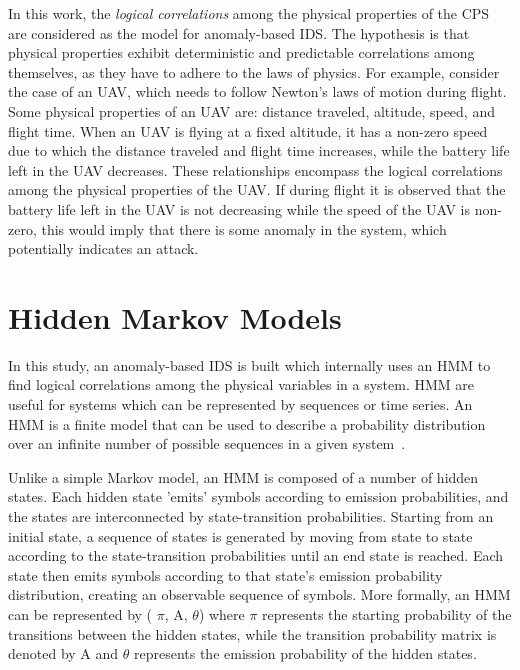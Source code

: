 In this work, the {\em logical correlations} among the physical properties of the \ac{CPS} are considered as the model for anomaly-based \ac{IDS}. The hypothesis is that physical properties exhibit deterministic and predictable correlations among themselves, as they have to adhere to the laws of physics. For example, consider the case of an \ac{UAV}, which needs to follow Newton's laws of motion during flight. Some physical properties of an \ac{UAV} are: distance traveled, altitude, speed, and flight time. When an \ac{UAV} is flying at a fixed altitude, it has a non-zero speed due to which the distance traveled and flight time increases, while the battery life left in the \ac{UAV} decreases. These relationships encompass the logical correlations among the physical properties of the \ac{UAV}. If during flight it is observed that the battery life left in the \ac{UAV} is not decreasing while the speed of the \ac{UAV} is non-zero, this would imply that there is some anomaly in the system, which potentially indicates an attack.

\section{Hidden Markov Models}
\label{sec:HMM_explain}

In this study, an anomaly-based \ac{IDS} is built which internally uses an \ac{HMM} to find logical correlations among the physical variables in a system. \ac{HMM} are useful for systems which can be represented by sequences or time series. An \ac{HMM} is a finite model that can be used to describe a probability distribution over an infinite number of possible sequences in a given system~\cite{eddy1996hidden}.

Unlike a simple Markov model, an \ac{HMM} is composed of a number of hidden states. Each hidden state 'emits' symbols according to emission probabilities, and the states are interconnected by state-transition probabilities. Starting from an initial state, a sequence of states is generated by moving from state to state according to the state-transition probabilities until an end state is reached. Each state then emits symbols according to that state's emission probability distribution, creating an observable sequence of symbols.
More formally, an \ac{HMM} can be represented by ( $\pi$, A, $\theta$) where $\pi$ represents the starting probability of the transitions between the hidden states, while the transition probability matrix is denoted by A and $\theta$ represents the emission probability of the hidden states.

